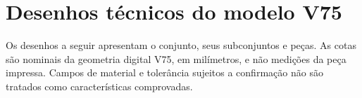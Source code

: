 \chapter{Desenhos técnicos do modelo V75}\label{ap:desenhos}
Os desenhos a seguir apresentam o conjunto, seus subconjuntos e peças.
As cotas são nominais da geometria digital V75, em milímetros, e não medições da peça impressa.
Campos de material e tolerância sujeitos a confirmação não são tratados como características comprovadas.
\clearpage

